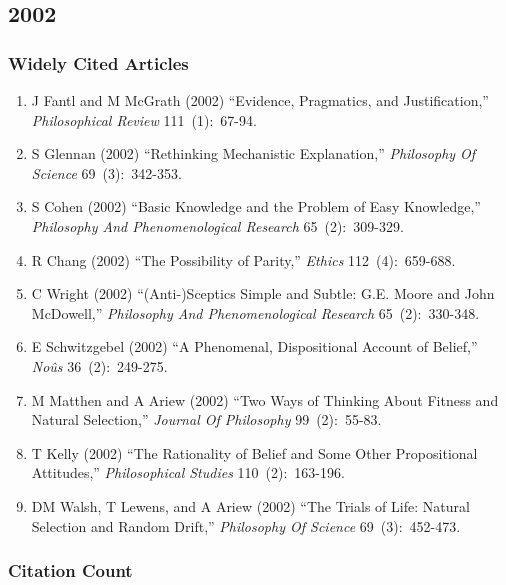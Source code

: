 \documentclass[
  10pt,
  letterpaper,
  DIV=11,
  numbers=noendperiod,
  twoside]{scrartcl}
\providecommand{\tightlist}{%
  \setlength{\itemsep}{0pt}\setlength{\parskip}{0pt}}\usepackage{longtable,booktabs,array}
\begin{document}
\newpage

\subsection{2002}\label{sec-s2002}

\subsubsection*{Widely Cited Articles}\label{widely-cited-articles-45}

\begin{enumerate}
\def\labelenumi{\arabic{enumi}.}
\tightlist
\item
  J Fantl and M McGrath (2002) ``Evidence, Pragmatics, and
  Justification,'' \emph{Philosophical Review} 111~(1):~67-94.
\item
  S Glennan (2002) ``Rethinking Mechanistic Explanation,''
  \emph{Philosophy Of Science} 69~(3):~342-353.
\item
  S Cohen (2002) ``Basic Knowledge and the Problem of Easy Knowledge,''
  \emph{Philosophy And Phenomenological Research} 65~(2):~309-329.
\item
  R Chang (2002) ``The Possibility of Parity,'' \emph{Ethics}
  112~(4):~659-688.
\item
  C Wright (2002) ``(Anti-)Sceptics Simple and Subtle: G.E. Moore and
  John McDowell,'' \emph{Philosophy And Phenomenological Research}
  65~(2):~330-348.
\item
  E Schwitzgebel (2002) ``A Phenomenal, Dispositional Account of
  Belief,'' \emph{Noûs} 36~(2):~249-275.
\item
  M Matthen and A Ariew (2002) ``Two Ways of Thinking About Fitness and
  Natural Selection,'' \emph{Journal Of Philosophy} 99~(2):~55-83.
\item
  T Kelly (2002) ``The Rationality of Belief and Some Other
  Propositional Attitudes,'' \emph{Philosophical Studies}
  110~(2):~163-196.
\item
  DM Walsh, T Lewens, and A Ariew (2002) ``The Trials of Life: Natural
  Selection and Random Drift,'' \emph{Philosophy Of Science}
  69~(3):~452-473.
\end{enumerate}

\subsubsection*{Citation Count}\label{sec-count-2002}
\end{document}
